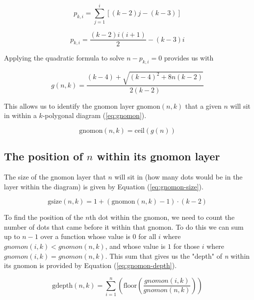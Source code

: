 \documentclass[notitlepage]{report}
\begin{document}
\begin{equation}
    p_{k,i} = \sum^{i}_{j=1}\left[(k-2)j-(k-3)\right]
    \label{eq:summation}
\end{equation}

\begin{equation}
    p_{k,i} = \frac{(k-2)i(i+1)}{2} - (k-3)i
    \label{eq:quad}
\end{equation}

Applying the quadratic formula to solve $n-p_{k,i}=0$ provides us with

\begin{equation}
    g\left(n,k\right)=\frac{\left(k-4\right)+\sqrt{\left(k-4\right)^{2}+8n\left(k-2\right)}}{2\left(k-2\right)}
     \label{eq:quadform}
\end{equation}

This allows us to identify the gnomon layer $\text{gnomon}(n,k)$ that a given $n$ will sit in within a $k$-polygonal diagram (\ref{eq:gnomon}).

\begin{equation}
    \text{gnomon}\left(n,k\right) = \text{ceil}\left(g\left(n\right)\right)  
    \label{eq:gnomon}
\end{equation}

\subsection*{The position of $n$ within its gnomon layer}

The size of the gnomon layer that $n$ will sit in (how many dots would be in the layer within the diagram) is given by Equation (\ref{eq:gnomon-size}).

\begin{equation}
\text{gsize}\left(n,k\right)= 1+(\text{gnomon}\left(n,k\right)-1)\cdot\left(k-2\right)
\label{eq:gnomon-size}
\end{equation}

To find the position of the $n$th dot within the gnomon, we need to count the number of dots that came before it within that gnomon. To do this we can sum up to $n-1$ over a function whose value is $0$ for all $i$ where $gnomon(i,k)<gnomon(n,k)$, and whose value is $1$ for those $i$ where $gnomon(i,k)=gnomon(n,k)$. This sum that gives us the "depth" of \textit{n} within its gnomon is provided by Equation (\ref{eq:gnomon-depth}).

\begin{equation}
    \text{gdepth}\left(n,k\right)=\sum_{i=1}^{n}\left(\text{floor}\left(\frac{gnomon\left(i,k\right)}{gnomon\left(n,k\right)}\right)\right)
    \label{eq:gnomon-depth}
\end{equation}
\end{document}
